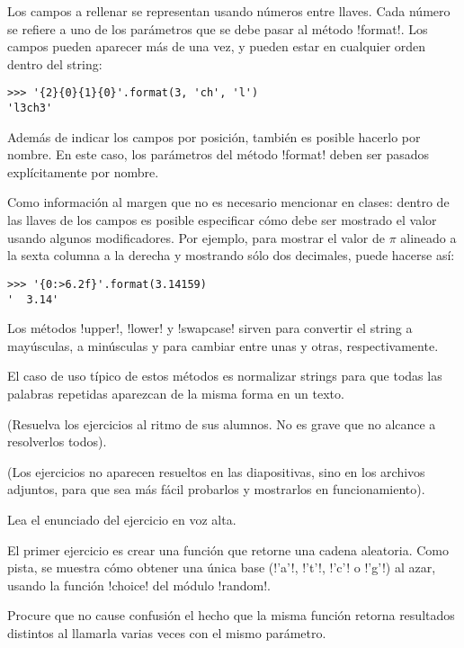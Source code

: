 \documentclass[10pt]{article}
\begin{document}
  Los campos a rellenar se representan usando números entre llaves.
  Cada número se refiere a uno de los parámetros que se debe pasar
  al método \li!format!. Los campos pueden aparecer más de una vez,
  y pueden estar en cualquier orden dentro del string:
\begin{lstlisting}
>>> '{2}{0}{1}{0}'.format(3, 'ch', 'l')
'l3ch3'
\end{lstlisting}


  Además de indicar los campos por posición,
  también es posible hacerlo por nombre.
  En este caso,
  los parámetros del método \li!format!
  deben ser pasados explícitamente por nombre.

  Como información al margen que no es necesario mencionar en clases:
  dentro de las llaves de los campos
  es posible especificar cómo debe ser mostrado el valor
  usando algunos modificadores.
  Por ejemplo, para mostrar el valor de \(\pi\)
  alineado a la sexta columna a la derecha
  y mostrando sólo dos decimales,
  puede hacerse así:
\begin{lstlisting}
>>> '{0:>6.2f}'.format(3.14159)
'  3.14'
\end{lstlisting}


  Los métodos \li!upper!, \li!lower! y \li!swapcase!
  sirven para convertir el string a mayúsculas, a minúsculas
  y para cambiar entre unas y otras, respectivamente.

  El caso de uso típico de estos métodos
  es normalizar strings para que todas las palabras repetidas
  aparezcan de la misma forma en un texto.


  (Resuelva los ejercicios al ritmo de sus alumnos.
  No es grave que no alcance a resolverlos todos).

  (Los ejercicios no aparecen resueltos en las diapositivas,
  sino en los archivos adjuntos,
  para que sea más fácil probarlos y mostrarlos en funcionamiento).

  Lea el enunciado del ejercicio en voz alta.

  El primer ejercicio es crear una función
  que retorne una cadena aleatoria.
  Como pista, se muestra cómo obtener una única base
  (\li!'a'!, \li!'t'!, \li!'c'! o \li!'g'!)
  al azar, usando la función \li!choice! del módulo \li!random!.

  Procure que no cause confusión el hecho que la misma función
  retorna resultados distintos al llamarla varias veces con el mismo parámetro.
\end{document}
